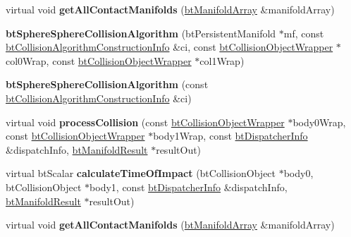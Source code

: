 \begin{DoxyCompactItemize}
\item 
\mbox{\label{classbtSphereSphereCollisionAlgorithm_a12213d0da7590fd25b9bfb580ab1e70c}} 
virtual void {\bfseries get\+All\+Contact\+Manifolds} (\hyperlink{classbtAlignedObjectArray}{bt\+Manifold\+Array} \&manifold\+Array)
\item 
\mbox{\label{classbtSphereSphereCollisionAlgorithm_a861896f2389f4b8b4a45fda9dc5f5a88}} 
{\bfseries bt\+Sphere\+Sphere\+Collision\+Algorithm} (bt\+Persistent\+Manifold $\ast$mf, const \hyperlink{structbtCollisionAlgorithmConstructionInfo}{bt\+Collision\+Algorithm\+Construction\+Info} \&ci, const \hyperlink{structbtCollisionObjectWrapper}{bt\+Collision\+Object\+Wrapper} $\ast$col0\+Wrap, const \hyperlink{structbtCollisionObjectWrapper}{bt\+Collision\+Object\+Wrapper} $\ast$col1\+Wrap)
\item 
\mbox{\label{classbtSphereSphereCollisionAlgorithm_a0e088c92f8e8a1e5a82b118dec7f930c}} 
{\bfseries bt\+Sphere\+Sphere\+Collision\+Algorithm} (const \hyperlink{structbtCollisionAlgorithmConstructionInfo}{bt\+Collision\+Algorithm\+Construction\+Info} \&ci)
\item 
\mbox{\label{classbtSphereSphereCollisionAlgorithm_a959d0d6d768f3cfecc79a3732db65036}} 
virtual void {\bfseries process\+Collision} (const \hyperlink{structbtCollisionObjectWrapper}{bt\+Collision\+Object\+Wrapper} $\ast$body0\+Wrap, const \hyperlink{structbtCollisionObjectWrapper}{bt\+Collision\+Object\+Wrapper} $\ast$body1\+Wrap, const \hyperlink{structbtDispatcherInfo}{bt\+Dispatcher\+Info} \&dispatch\+Info, \hyperlink{classbtManifoldResult}{bt\+Manifold\+Result} $\ast$result\+Out)
\item 
\mbox{\label{classbtSphereSphereCollisionAlgorithm_a6053220d079393f1cdd14f1e2ee15d4d}} 
virtual bt\+Scalar {\bfseries calculate\+Time\+Of\+Impact} (bt\+Collision\+Object $\ast$body0, bt\+Collision\+Object $\ast$body1, const \hyperlink{structbtDispatcherInfo}{bt\+Dispatcher\+Info} \&dispatch\+Info, \hyperlink{classbtManifoldResult}{bt\+Manifold\+Result} $\ast$result\+Out)
\item 
\mbox{\label{classbtSphereSphereCollisionAlgorithm_a12213d0da7590fd25b9bfb580ab1e70c}} 
virtual void {\bfseries get\+All\+Contact\+Manifolds} (\hyperlink{classbtAlignedObjectArray}{bt\+Manifold\+Array} \&manifold\+Array)
\end{DoxyCompactItemize}
